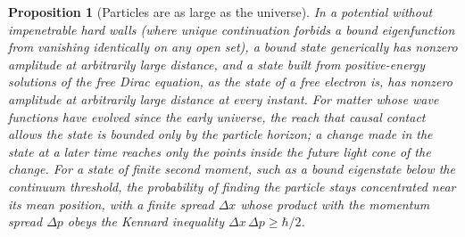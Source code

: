 \documentclass[aps,prd,onecolumn,tightenlines,nofootinbib,notitlepage,11pt,floatfix]{revtex4-2}
\theoremstyle{indentedtheorem}
\newtheorem{proposition}{Proposition}
\begin{document}
\begin{proposition}[Particles are as large as the universe]\label{prop:reach}
In a potential without impenetrable hard walls (where unique continuation forbids a bound eigenfunction from vanishing identically on any open set), a bound state generically has nonzero amplitude at arbitrarily large distance, and a state built from positive-energy solutions of the free Dirac equation, as the state of a free electron is, has nonzero amplitude at arbitrarily large distance at every instant. For matter whose wave functions have evolved since the early universe, the reach that causal contact allows the state is bounded only by the particle horizon; a change made in the state at a later time reaches only the points inside the future light cone of the change. For a state of finite second moment, such as a bound eigenstate below the continuum threshold, the probability of finding the particle stays concentrated near its mean position, with a finite spread $\Delta x$ whose product with the momentum spread $\Delta p$ obeys the Kennard inequality $\Delta x\,\Delta p\geq\hbar/2$.
\end{proposition}
\end{document}
